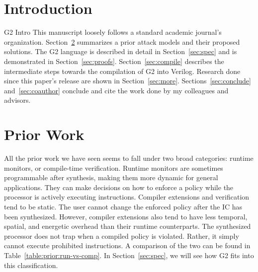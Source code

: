 \documentclass[sigconf,usenames,dvipsnames,svgnames,table]{acmart}
\def \sysname {\textsc{G2}\xspace}
\begin{document}

\maketitle
  \section{Introduction}\label{sec:intro}
    \sysname Intro
    \cite{2011gem5sim}
    \cite{2019stt}
    This manuscript loosely follows a standard academic journal's organization.
    Section~\ref{sec:priorwork} summarizes a prior attack models and their proposed solutions.
    The \sysname language is described in detail in Section~\ref{sec:spec} and is demonstrated in Section~\ref{sec:proofs}.
    Section~\ref{sec:compile} describes the intermediate steps towards the compilation of \sysname into Verilog.
    Research done since this paper's release are shown in Section~\ref{sec:more}.
    Sections~\ref{sec:conclude} and~\ref{sec:coauthor} conclude and cite the work done by my colleagues and advisors.

  \section{Prior Work}\label{sec:priorwork}
    All the prior work we have seen seems to fall under two broad categories: runtime monitors, or compile-time verification.
    Runtime monitors are sometimes programmable after synthesis, making them more dynamic for general applications.
    They can make decisions on how to enforce a policy while the processor is actively executing instructions.
    Compiler extensions and verification tend to be static.
    The user cannot change the enforced policy after the IC has been synthesized.
    However, compiler extensions also tend to have less temporal, spatial, and energetic overhead than their runtime counterparts.
    The synthesized processor does not trap when a compiled policy is violated.
    Rather, it simply cannot execute prohibited instructions. 
    A comparison of the two can be found in Table~\ref{table:prior:run-vs-comp}.
    In Section~\ref{sec:spec}, %
    we will see how \sysname fits into this classification.
\end{document}
